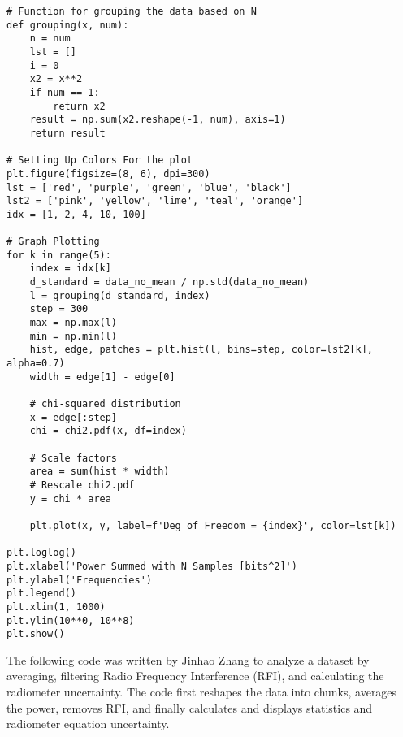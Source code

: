 \documentclass[10pt, preprint]{aastex}
\begin{document}
\begin{verbatim}
# Function for grouping the data based on N
def grouping(x, num):
    n = num
    lst = []
    i = 0
    x2 = x**2
    if num == 1:
        return x2
    result = np.sum(x2.reshape(-1, num), axis=1)
    return result

# Setting Up Colors For the plot
plt.figure(figsize=(8, 6), dpi=300)
lst = ['red', 'purple', 'green', 'blue', 'black']
lst2 = ['pink', 'yellow', 'lime', 'teal', 'orange'] 
idx = [1, 2, 4, 10, 100]

# Graph Plotting
for k in range(5):
    index = idx[k]
    d_standard = data_no_mean / np.std(data_no_mean)
    l = grouping(d_standard, index)
    step = 300   
    max = np.max(l)
    min = np.min(l)
    hist, edge, patches = plt.hist(l, bins=step, color=lst2[k], alpha=0.7)
    width = edge[1] - edge[0]
    
    # chi-squared distribution
    x = edge[:step]
    chi = chi2.pdf(x, df=index)

    # Scale factors
    area = sum(hist * width)
    # Rescale chi2.pdf
    y = chi * area
    
    plt.plot(x, y, label=f'Deg of Freedom = {index}', color=lst[k]) 

plt.loglog()
plt.xlabel('Power Summed with N Samples [bits^2]')
plt.ylabel('Frequencies')
plt.legend()
plt.xlim(1, 1000)
plt.ylim(10**0, 10**8)
plt.show()
\end{verbatim}

The following code was written by Jinhao Zhang to analyze a dataset by averaging, filtering Radio Frequency Interference (RFI), and calculating the radiometer uncertainty. The code first reshapes the data into chunks, averages the power, removes RFI, and finally calculates and displays statistics and radiometer equation uncertainty.
\end{document}
